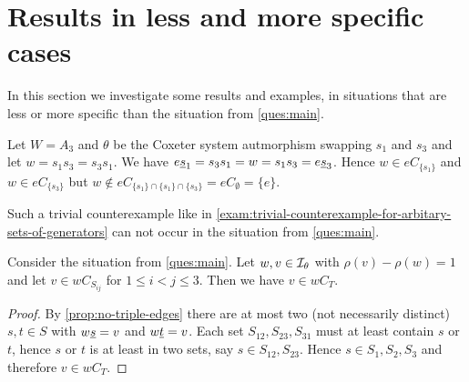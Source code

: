 \section{Results in less and more specific cases}
\label{sec:sec:main-thesis-less-more-specific}

%
%		

In this section we investigate some results and examples, in situations that are less or more specific than the situation from \ref{ques:main}.

\begin{exam}
	Let $W = A_3$ and $\theta$ be the Coxeter system autmorphism swapping $s_1$ and $s_3$ and let $w = s_1s_3 = s_3s_1$. We have $e \underline{s}_1 = s_3 s_1 = w = s_1 s_3 = e \underline{s}_3$. Hence $w \in eC_{\{s_1\}}$ and $w \in eC_{\{s_3\}}$ but $w \notin eC_{\{s_1\} \cap \{s_1\} \cap \{s_3\}} = eC_\emptyset = \{e\}$.
\end{exam}

Such a trivial counterexample like in \ref{exam:trivial-counterexample-for-arbitary-sets-of-generators} can not occur in the situation from \ref{ques:main}.

\begin{prop}
	Consider the situation from \ref{ques:main}. Let $w,v \in \mathcal{I}_{\theta}$ with $\rho(v) - \rho(w) = 1$ and let $v \in w C_{S_{ij}}$ for $1 \leq i < j \leq 3$. Then we have $v \in wC_T$.

	\begin{proof}
		By \ref{prop:no-triple-edges} there are at most two (not necessarily distinct) $s,t \in S$ with $w \underline{s} = v$ and $w \underline{t} = v$. Each set $S_{12},S_{23},S_{31}$ must at least contain $s$ or $t$, hence $s$ or $t$ is at least in two sets, say $s \in S_{12},S_{23}$. Hence $s \in S_1,S_2,S_3$ and therefore $v \in wC_T$.
	\end{proof}
\end{prop}

